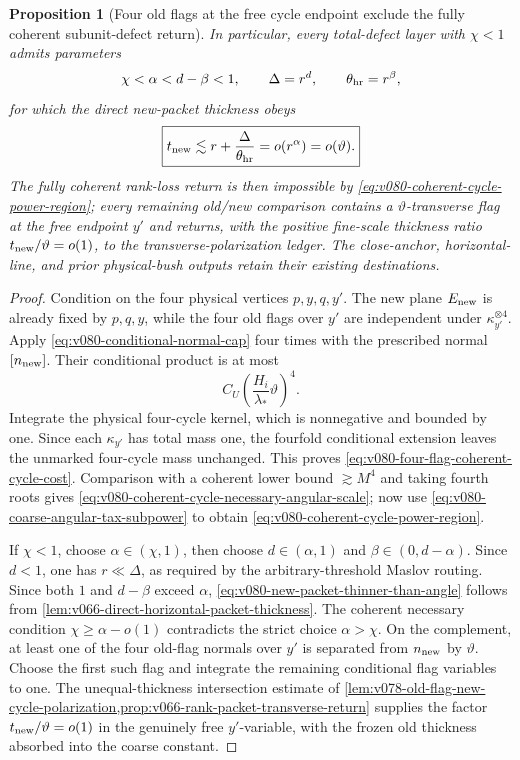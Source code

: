 \documentclass[10pt]{article}
\newtheorem{proposition}[theorem]{Proposition}
\begin{document}
\begin{proposition}[Four old flags at the free cycle endpoint exclude the fully coherent
subunit-defect return]
In particular, every total-defect layer with \(\chi<1\) admits parameters
\[
\chi<\alpha<d-\beta<1,
\qquad
\Delta=r^d,
\qquad
\theta_{\rm hr}=r^\beta,
\]
for which the direct new-packet thickness obeys
\begin{equation}
\label{eq:v080-new-packet-thinner-than-angle}
\boxed{
t_{\rm new}
\lesssim
r+\frac{\Delta}{\theta_{\rm hr}}
=
o(r^\alpha)
=
o(\vartheta).
}
\end{equation}
The fully coherent rank-loss return is then impossible by
\eqref{eq:v080-coherent-cycle-power-region}; every remaining old/new comparison contains a
\(\vartheta\)-transverse flag at the free endpoint \(y'\) and returns, with the positive fine-scale
thickness ratio \(t_{\rm new}/\vartheta=o(1)\), to the transverse-polarization ledger.  The
close-anchor, horizontal-line, and prior physical-bush outputs retain their existing destinations.
\end{proposition}

\begin{proof}
Condition on the four physical vertices \(p,y,q,y'\).  The new plane
\(E_{\rm new}\) is already fixed by \(p,q,y\), while the four old flags over \(y'\) are independent
under \(\kappa_{y'}^{\otimes4}\).  Apply
\eqref{eq:v080-conditional-normal-cap} four times with the prescribed normal
\([n_{\rm new}]\).  Their conditional product is at most
\[
C_U
\left(\frac{H_i}{\lambda_*}\vartheta\right)^4.
\]
Integrate the physical four-cycle kernel, which is nonnegative and bounded by one.  Since each
\(\kappa_{y'}\) has total mass one, the fourfold conditional extension leaves the unmarked
four-cycle mass unchanged.  This proves \eqref{eq:v080-four-flag-coherent-cycle-cost}.  Comparison
with a coherent lower bound \(\gtrsim M^4\) and taking fourth roots gives
\eqref{eq:v080-coherent-cycle-necessary-angular-scale}; now use
\eqref{eq:v080-coarse-angular-tax-subpower} to obtain
\eqref{eq:v080-coherent-cycle-power-region}.

If \(\chi<1\), choose \(\alpha\in(\chi,1)\), then choose
\(d\in(\alpha,1)\) and
\(\beta\in(0,d-\alpha)\).  Since \(d<1\), one has \(r\ll\Delta\), as required by the
arbitrary-threshold Maslov routing.  Since both \(1\) and \(d-\beta\) exceed \(\alpha\),
\eqref{eq:v080-new-packet-thinner-than-angle} follows from
\cref{lem:v066-direct-horizontal-packet-thickness}.  The coherent necessary condition
\(\chi\ge\alpha-o(1)\) contradicts the strict choice \(\alpha>\chi\).  On the complement, at least
one of the four old-flag normals over \(y'\) is separated from \(n_{\rm new}\) by
\(\vartheta\).  Choose the first such flag and integrate the remaining conditional flag variables
to one.  The unequal-thickness intersection estimate of
\cref{lem:v078-old-flag-new-cycle-polarization,prop:v066-rank-packet-transverse-return} supplies
the factor \(t_{\rm new}/\vartheta=o(1)\) in the genuinely free \(y'\)-variable, with the frozen
old thickness absorbed into the coarse constant.
\end{proof}
\end{document}
